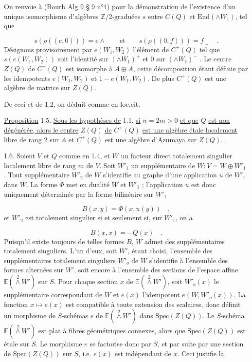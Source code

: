 On renvoie à (Bourb Alg 9 § 9 n°4) pour la démonstration de l'existence d'un unique isomorphisme d'algèbres $\mathbb{Z}/2$-graduées $s$ entre $C(Q)$ et $\mathrm{End}(\wedge W_1)$, tel que

\begin{equation*}
s(\rho((e,0))) = e \wedge \qquad \mbox{et} \qquad s(\rho((0,f))) = f \llcorner \quad .
\end{equation*}
Désignons provisoirement par $e(W_1,W_2)$ l'élément de $C^+(Q)$ tel que $s(e(W_1,W_2))$ soit l'identité sur $(\wedge W_1)^+$ et $0$ sur $(\wedge W_1)^-$ . Le centre $Z(Q)$ de $C^+(Q)$ est isomorphe à $A \oplus A$, cette décomposition étant définie par les idempotents $e(W_1,W_2)$ et $1 - e(W_1,W_2)$. De plus $C^+(Q)$ est une algèbre de matrice sur $Z(Q)$.

De ceci et de 1.2, on déduit comme en loc.cit.

\underline{Proposition} 1.5. \underline{Sous les hypothèses de} 1.1, \underline{si} $n = 2m > 0$ \underline{et que} $Q$ \underline{est non dégénérée, alors le centre} $Z(Q)$ \underline{de} $C^+(Q)$ \underline{est une algèbre étale localement libre de rang} 2 \underline{sur} $A$ \underline{et} $C^+(Q)$ \underline{est une algèbre d'Azumaya sur} $Z(Q)$.

1.6. Soient $V$ et $Q$ comme en 1.4, et $W$ un facteur direct totalement singulier localement libre de rang $m$ de $V$. Soit $W'_1$ un supplémentaire de $W : V = W \oplus W'_1$ . Tout supplémentaire $W'_2$ de $W$ s'identifie au graphe d'une application $u$ de $W'_1$ dans $W$. La forme $\Phi$ met en dualité $W$ et $W'_1$ ; l'application $u$ est donc uniquement déterminée par la forme bilinéaire sur $W'_1$ 



\begin{equation*}
 B(x,y) = \Phi(x,u(y)) \quad ,
\end{equation*}
et $W'_2$ est totalement singulier si et seulement si, sur $W'_1$, on a

\begin{equation*}
B(x,x) = - Q(x) \quad .
\end{equation*}
Puisqu'il existe toujours de telles formes $B$, $W$ admet des supplémentaires totalement singuliers. L'un d'eux, soit $W'$, étant choisi, l'ensemble des supplémentaires totalement singuliers $W'_o$ de $W$ s'identifie à l'ensemble des formes alternées sur $W'$, soit encore à l'ensemble des sections de l'espace affine $\mathbb{E}(\overset{2}{\wedge} W')$ sur $S$. Pour chaque section $x$ de $\mathbb{E}(\overset{2}{\wedge} W')$, soit $W'_o(x)$ le supplémentaire correspondant de $W$ et $e(x)$ l'idempotent $e(W, W'_o(x))$. La fonction $x \longmapsto e(x)$ est compatible à toute extension des scalaires, donc définit un morphisme de $S$-schémas $e$ de $\mathbb{E}(\overset{2}{\wedge} W')$ dans $\mathrm{Spec}(Z(Q))$. Le $S$-schéma $\mathbb{E}(\overset{2}{\wedge} W')$ est plat à fibres géométriques connexes, alors que $\mathrm{Spec}(Z(Q))$ est étale sur $S$. Le morphisme $e$ se factorise donc par $S$, et par suite par une section de $\mathrm{Spec}(Z(Q))$ sur $S$, i.e. $e(x)$ est indépendant de $x$. Ceci justifie la

